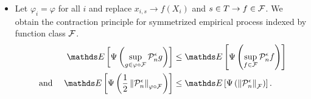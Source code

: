\documentclass[11pt]{article}
\begin{document}
\begin{itemize}
\item \begin{remark}
Let $\varphi_i = \varphi$ for all $i$ and replace $x_{i,s} \to f(X_i)$ and $s\in T \to f\in {\mathcal F}$. We obtain the contraction principle for symmetrized empirical process indexed by function class ${\mathcal F}$.
\begin{align}
\E{}{\Psi\paren{\sup_{g \in \varphi \circ \cF} \cP_n^{\epsilon} g}} &\le \E{}{\Psi\paren{\sup_{f \in \cF} \cP_n^{\epsilon}f}} \label{ineqn: contraction_principle_3} \\
\text{ and }  \quad \E{}{\Psi\paren{\frac{1}{2}\norm{\cP_n^{\epsilon}}{\varphi \circ \cF}}} &\le \E{}{\Psi\paren{\norm{\cP_n^{\epsilon}}{\cF}}}. \nonumber
\end{align}
\end{remark}
\end{itemize}
\end{document}
